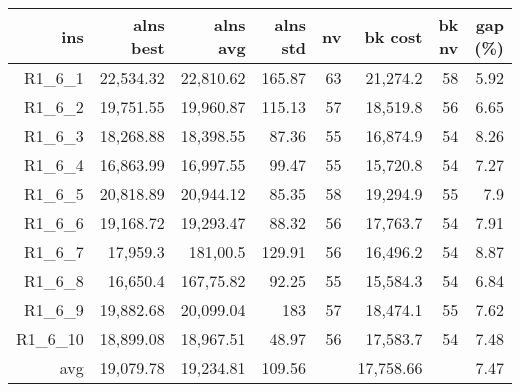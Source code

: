   \begin{table}[caption={Kết quả đo với tập HG\_R\_1\_6 600 yêu cầu}, label=exp:HGR16]
    \small
    \centering
    \begin{tabular}{rrrrrrrr}
    \hline
    ins & alns best & alns avg & alns std & nv & bk cost & bk nv & gap (\%) \\ \hline
    R1\_6\_1 & 22,534.32 & 22,810.62 & 165.87 & 63 & 21,274.2 & 58 & 5.92 \\ \hline
    R1\_6\_2 & 19,751.55 & 19,960.87 & 115.13 & 57 & 18,519.8 & 56 & 6.65 \\ \hline
    R1\_6\_3 & 18,268.88 & 18,398.55 & 87.36 & 55 & 16,874.9 & 54 & 8.26 \\ \hline
    R1\_6\_4 & 16,863.99 & 16,997.55 & 99.47 & 55 & 15,720.8 & 54 & 7.27 \\ \hline
    R1\_6\_5 & 20,818.89 & 20,944.12 & 85.35 & 58 & 19,294.9 & 55 & 7.9 \\ \hline
    R1\_6\_6 & 19,168.72 & 19,293.47 & 88.32 & 56 & 17,763.7 & 54 & 7.91 \\ \hline
    R1\_6\_7 & 17,959.3 & 181,00.5 & 129.91 & 56 & 16,496.2 & 54 & 8.87 \\ \hline
    R1\_6\_8 & 16,650.4 & 167,75.82 & 92.25 & 55 & 15,584.3 & 54 & 6.84 \\ \hline
    R1\_6\_9 & 19,882.68 & 20,099.04 & 183 & 57 & 18,474.1 & 55 & 7.62 \\ \hline
    R1\_6\_10 & 18,899.08 & 18,967.51 & 48.97 & 56 & 17,583.7 & 54 & 7.48 \\ \hline
    avg & 19,079.78 & 19,234.81 & 109.56 & & 17,758.66 & & 7.47 \\ \hline
    \end{tabular}
  \end{table}


